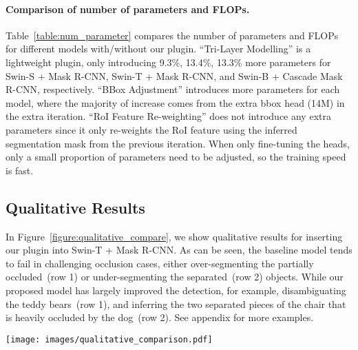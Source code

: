 \documentclass{bmvc2k}
\begin{document}
\paragraph{Comparison of number of parameters and FLOPs.}
Table~\ref{table:num_parameter} compares the number of parameters and FLOPs for different models with/without our plugin. ``Tri-Layer Modelling'' is a lightweight plugin, only introducing 9.3\%, 13.4\%, 13.3\% more parameters for Swin-S + Mask R-CNN, Swin-T + Mask R-CNN, and Swin-B + Cascade Mask R-CNN, respectively.
``BBox Adjustment'' introduces more parameters for each model, where the majority of increase comes from the extra bbox head (14M) in the extra iteration. ``RoI Feature Re-weighting'' does not introduce any extra parameters since it only re-weights the RoI feature using the inferred segmentation mask from the previous iteration. When only fine-tuning the heads, only a small proportion of parameters need to be adjusted, so the training speed is fast. 




\subsection{Qualitative Results}
\label{qualitative_results}

In Figure~\ref{figure:qualitative_compare}, 
we show qualitative results for inserting our plugin into Swin-T + Mask R-CNN.
As can be seen, the baseline model tends to fail in challenging occlusion cases, 
either over-segmenting the partially occluded~(row 1) or under-segmenting the separated~(row 2) objects.
While our proposed model has largely improved the detection, 
for example, disambiguating the teddy bears~(row 1), 
and inferring the two separated pieces of the chair that is heavily occluded by the dog~(row 2). See appendix for more examples.\\[-0.7cm]



\begin{figure*}[!htb]
		\centering
		\texttt{[image: images/qualitative\_comparison.pdf]}
		\vspace{-6mm}
		\caption{\textcolor{bmvc_blue}{\textbf{Qualitative results on COCO.} 
		Please see the text for more discussion. More qualitative results are provided in appendix.
  }}
		\label{figure:qualitative_compare}
 		\vspace{-6mm}
\end{figure*}
 \vspace{-0.3cm}
\end{document}
